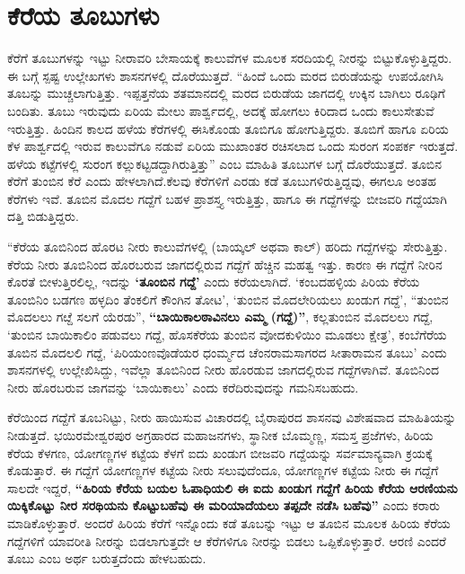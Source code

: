 \section{ಕೆರೆಯ ತೂಬುಗಳು}

ಕೆರೆಗೆ ತೂಬುಗಳನ್ನು ಇಟ್ಟು ನೀರಾವರಿ ಬೇಸಾಯಕ್ಕೆ ಕಾಲುವೆಗಳ ಮೂಲಕ ಸರದಿಯಲ್ಲಿ ನೀರನ್ನು ಬಿಟ್ಟುಕೊಳ್ಳುತ್ತಿದ್ದರು. ಈ ಬಗ್ಗೆ ಸ್ಪಷ್ಟ ಉಲ್ಲೇಖಗಳು ಶಾಸನಗಳಲ್ಲಿ ದೊರೆಯುತ್ತದೆ. “ಹಿಂದೆ ಒಂದು ಮರದ ಬಿರುಡೆಯನ್ನು ಉಪಯೋಗಿಸಿ ತೂಬನ್ನು ಮುಚ್ಚಲಾಗುತ್ತಿತ್ತು. ಇಪ್ಪತ್ತನೆಯ ಶತಮಾನದಲ್ಲಿ ಮರದ ಬಿರುಡೆಯ ಜಾಗದಲ್ಲಿ ಉಕ್ಕಿನ ಬಾಗಿಲು ರೂಢಿಗೆ ಬಂದಿತು. ತೂಬು ಇರುವುದು ಏರಿಯ ಮೇಲು ಪಾರ್ಶ್ವದಲ್ಲಿ, ಅದಕ್ಕೆ ಹೋಗಲು ಕಿರಿದಾದ ಒಂದು ಕಾಲುಸೇತುವೆ ಇರುತ್ತಿತ್ತು. ಹಿಂದಿನ ಕಾಲದ ಹಳೆಯ ಕೆರೆಗಳಲ್ಲಿ ಈಸಿಕೊಂಡು ತೂಬಿಗೂ ಹೋಗುತ್ತಿದ್ದರು. ತೂಬಿಗೆ ಹಾಗೂ ಏರಿಯ ಕೆಳ ಪಾರ್ಶ್ವದಲ್ಲಿ ಇರುವ ಕಾಲುವೆಗೂ ನಡುವೆ ಏರಿಯ ಮುಖಾಂತರ ರಚಿಸಲಾದ ಒಂದು ಸುರಂಗ ಸಂಪರ್ಕ ಇರುತ್ತದೆ. ಹಳೆಯ ಕಟ್ಟೆಗಳಲ್ಲಿ ಸುರಂಗ ಕಲ್ಲುಕಟ್ಟಡದ್ದಾಗಿರುತ್ತಿತ್ತು” ಎಂಬ ಮಾಹಿತಿ ತೂಬುಗಳ ಬಗ್ಗೆ ದೊರೆಯುತ್ತದೆ. ತೂಬಿನ ಕೆರೆಗೆ ತುಂಬಿನ ಕೆರೆ ಎಂದು ಹೇಳಲಾಗಿದೆ.ಕೆಲವು ಕೆರೆಗಳಿಗೆ ಎರಡು ಕಡೆ ತೂಬುಗಳಿರುತ್ತಿದ್ದವು, ಈಗಲೂ ಅಂತಹ ಕೆರೆಗಳು ಇವೆ. ತೂಬಿನ ಮೊದಲ ಗದ್ದೆಗೆ ಬಹಳ ಪ್ರಾಶಸ್ತ್ಯ ಇರುತ್ತಿತ್ತು, ಹಾಗೂ ಈ ಗದ್ದೆಗಳನ್ನು ಬೀಜವರಿ ಗದ್ದೆಯಾಗಿ ದತ್ತಿ ಬಿಡುತ್ತಿದ್ದರು.

“ಕೆರೆಯ ತೂಬಿನಿಂದ ಹೊರಟ ನೀರು ಕಾಲುವೆಗಳಲ್ಲಿ (ಬಾಯ್ಕಲ್​ ಅಥವಾ ಕಾಲ್​) ಹರಿದು ಗದ್ದೆಗಳನ್ನು ಸೇರುತ್ತಿತ್ತು. ಕೆರೆಯ ನೀರು ತೂಬಿನಿಂದ ಹೊರಬರುವ ಜಾಗದಲ್ಲಿರುವ ಗದ್ದೆಗೆ ಹೆಚ್ಚಿನ ಮಹತ್ವ ಇತ್ತು. ಕಾರಣ ಈ ಗದ್ದೆಗೆ ನೀರಿನ ಕೊರತೆ ಬೀಳುತ್ತಿರಲಿಲ್ಲ, ಇದನ್ನು \textbf{‘ತೂಂಬಿನ ಗದ್ದೆ’} ಎಂದು ಕರೆಯಲಾಗಿದೆ. ‘ಕಂಬದಹಳ್ಳಿಯ ಪಿರಿಯ ಕೆರೆಯ ತೂಂಬಿನಿಂ ಬಡಗಣ ಹಳ್ಳದಿಂ ತೆಂಕಲಿಗೆ ಕೌಂಗಿನ ತೋಟ’, ‘ತುಂಬಿನ ಮೊದಲೇರಿಯಲು ಖಂಡುಗ ಗದ್ದೆ’, “ತುಂಬಿನ ಮೊದಲಲು ಗೞ್ದೆ ಸಲಗೆ ಯೆರಡು”, \textbf{“ಬಾಯಿಕಾಲಠಾವಿನಲು ಎಮ್ಮ (ಗದ್ದೆ)”}, ಕಲ್ಲತುಂಬಿನ ಮೊದಲಲು ಗದ್ದೆ, ‘ತುಂಬಿನ ಬಾಯಿಕಾಲಿಂ ಪಡುವಲು ಗದ್ದೆ, ಹೊಸಕೆರೆಯ ತುಂಬಿನ ವೋದಕುಳಿಯಿಂ ಮೂಡಲು ಕ್ಷೇತ್ರ’, ಕಂಬೆಗೆರೆಯ ತೂಬಿನ ಮೊದಲಲಿ ಗದ್ದೆ,  ‘ಪಿರಿಯಂಣವೊಡೆಯರ ಧಂರ್ಮ್ಮದ ಚೆಂನರಾಮಸಾಗರದ ಸೀತಾರಾಮನ ತೂಬು’ ಎಂದು ಶಾಸನಗಳಲ್ಲಿ ಉಲ್ಲೇಖಿಸಿದ್ದು, ಇವೆಲ್ಲಾ ತೂಬಿನಿಂದ ನೀರು ಹೊರಡುವ ಜಾಗದಲ್ಲಿರುವ ಗದ್ದೆಗಳಾಗಿವೆ. ತೂಬಿನಿಂದ ನೀರು ಹೊರಬರುವ ಜಾಗವನ್ನು ‘ಬಾಯಿಕಾಲು’ ಎಂದು ಕರೆದಿರುವುದನ್ನು ಗಮನಿಸಬಹುದು.

ಕೆರೆಯಿಂದ ಗದ್ದೆಗೆ ತೂಬನಿಟ್ಟು, ನೀರು ಹಾಯಿಸುವ ವಿಚಾರದಲ್ಲಿ ಬೈರಾಪುರದ ಶಾಸನವು ವಿಶೇಷವಾದ ಮಾಹಿತಿಯನ್ನು ನೀಡುತ್ತದೆ. ಭಯಿರಮೇಶ್ವರಪುರ ಅಗ್ರಹಾರದ ಮಹಾಜನಗಳು, ಸ್ಥಾನೀಕ ಬೊಮ್ಮಣ್ಣ, ಸಮಸ್ತ ಪ್ರಜೆಗಳು, ಹಿರಿಯ ಕೆರೆಯ ಕೆಳಗಣ, ಯೋಗಣ್ಣಗಳ ಕಟ್ಟೆಯ ಕೆಳಗೆ ಐದು ಖಂಡುಗ ಬೀಜವರಿ ಗದ್ದೆಯನ್ನು ಸರ್ವಮಾನ್ಯವಾಗಿ ಕ್ರಯಕ್ಕೆ ಕೊಡುತ್ತಾರೆ. ಈ ಗದ್ದೆಗೆ ಯೋಗಣ್ಣಗಳ ಕಟ್ಟೆಯ ನೀರು ಸಲುವುದೆಂದೂ, ಯೋಗಣ್ಣಗಳ ಕಟ್ಟೆಯ ನೀರು ಈ ಗದ್ದೆಗೆ ಸಾಲದೇ ಇದ್ದರೆ, \textbf{“ಹಿರಿಯ ಕೆರೆಯ ಬಯಲ ಓಪಾಧಿಯಲಿ ಈ ಐದು ಖಂಡುಗ ಗದ್ದೆಗೆ ಹಿರಿಯ ಕೆರೆಯ ಆರಣಿಯನು ಯಿಕ್ಕಿಕೊಟ್ಟು ನೀರ ಸರಥಿಯನು ಕೊಟ್ಟುಬಹೆವು ಈ ಮರಿಯಾದೆಯಲು ತಪ್ಪದೇ ನಡೆಸಿ ಬಹೆವು”} ಎಂದು ಕರಾರು ಮಾಡಿಕೊಳ್ಳುತ್ತಾರೆ. ಅಂದರೆ ಹಿರಿಯ ಕೆರೆಗೆ ಇನ್ನೊಂದು ಕಡೆ ತೂಬನ್ನು ಇಟ್ಟು ಆ ತೂಬಿನ ಮೂಲಕ ಹಿರಿಯ ಕೆರೆಯ ಗದ್ದೆಗಳಿಗೆ ಯಾವರೀತಿ ನೀರನ್ನು ಬಿಡಲಾಗುತ್ತದೇ ಆ ಕೆರೆಗಳಿಗೂ ನೀರನ್ನು ಬಿಡಲು ಒಪ್ಪಿಕೊಳ್ಳುತ್ತಾರೆ. ಆರಣಿ ಎಂದರೆ ತೂಬು ಎಂಬ ಅರ್ಥ ಬರುತ್ತದೆಂದು ಹೇಳಬಹುದು.


